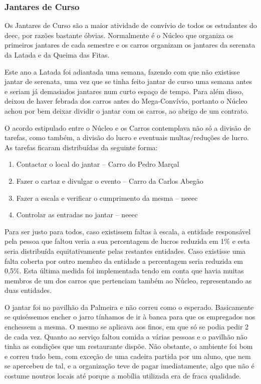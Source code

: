 
\subsubsection{Jantares de Curso}

Os Jantares de Curso são a maior atividade de convívio de todos os estudantes do \acrshort{deec}, por razões bastante óbvias. Normalmente é o Núcleo que organiza os primeiros jantares de cada semestre e os carros organizam os jantares da serenata da Latada e da Queima das Fitas.

Este ano a Latada foi adiantada uma semana, fazendo com que não existisse jantar de serenata, uma vez que se tinha feito jantar de curso uma semana antes e seriam já demasiados jantares num curto espaço de tempo. Para além disso, deixou de haver febrada dos carros antes do Mega-Convívio, portanto o Núcleo achou por bem deixar dividir o jantar com os carros, ao abrigo de um contrato.

O acordo estipulado entre o Núcleo e os Carros contemplava não só a divisão de tarefas, como também, a divisão do lucro e eventuais multas/reduções de lucro.
As tarefas ficaram distribuídas da seguinte forma:
\begin{enumerate}
\item Contactar o local do jantar – Carro do Pedro Marçal
\item Fazer o cartaz e divulgar o evento – Carro da Carlos Abegão
\item Fazer a escala e verificar o cumprimento da mesma – \acrshort{neeec}
\item Controlar as entradas no jantar – \acrshort{neeec}
\end{enumerate}

Para ser justo para todos, caso existissem faltas à escala, a entidade responsável pela pessoa que faltou veria a sua percentagem de lucros reduzida em 1\% e esta seria distribuída equitativamente pelas restantes entidades. Caso existisse uma falta coberta por outro membro da entidade a percentagem seria reduzida em 0,5\%. Esta última medida foi implementada tendo em conta que havia muitas membros de um dos carros que pertenciam também ao Núcleo, representando as duas entidades.

O jantar foi no pavilhão da Palmeira e não correu como o esperado. Basicamente se quiséssemos encher o jarro tínhamos de ir à banca para que os empregados nos enchessem a mesma. O mesmo se aplicava aos finos, em que só se podia pedir 2 de cada vez.
Quanto ao serviço faltou comida a várias pessoas e o pavilhão não tinha as condições que um restaurante dispõe. Não obstante, o ambiente foi bom e correu tudo bem, com exceção de uma cadeira partida por um aluno, que nem se apercebeu de tal, e a organização teve de pagar imediatamente, algo que não é costume noutros locais até porque a mobília utilizada era de fraca qualidade.

